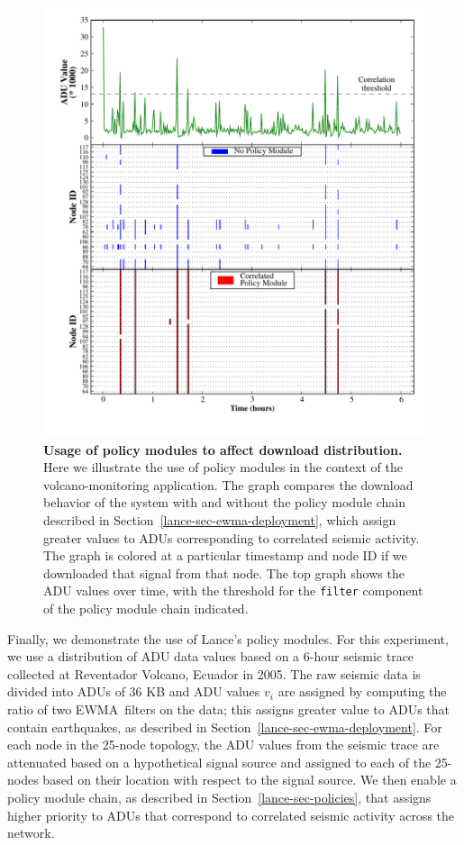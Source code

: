 \begin{figure}[t!]
\begin{center}
\includegraphics[width=0.7\hsize]{./4-lance/figs/fill.pdf}
\end{center}

\caption{\textbf{Usage of policy modules to affect download distribution.}
Here we illustrate the use of policy modules in the context of the
volcano-monitoring application. The graph compares the download behavior of
the system with and without the policy module chain described in
Section~\ref{lance-sec-ewma-deployment}, which assign greater values to ADUs
corresponding to correlated seismic activity. The graph is colored at a
particular timestamp and node ID if we downloaded that signal from that node.
The top graph shows the ADU values over time, with the threshold for the
\texttt{filter} component of the policy module chain indicated.}

\label{lance-fig-fill}
\end{figure}

Finally, we demonstrate the use of Lance's policy modules. For this
experiment, we use a distribution of ADU data values based on a 6-hour
seismic trace collected at Reventador Volcano, Ecuador in
2005. The raw seismic data is divided into ADUs of 36
KB and ADU values $v_i$ are assigned by computing the ratio of two
EWMA~filters on the data; this assigns greater value to ADUs that contain
earthquakes, as described in Section~\ref{lance-sec-ewma-deployment}. For
each node in the 25-node topology, the ADU values from the seismic trace are
attenuated based on a hypothetical signal source and assigned to each of the
25-nodes based on their location with respect to the signal source. We then
enable a policy module chain, as described in
Section~\ref{lance-sec-policies}, that assigns higher priority to ADUs that
correspond to correlated seismic activity across the network.

